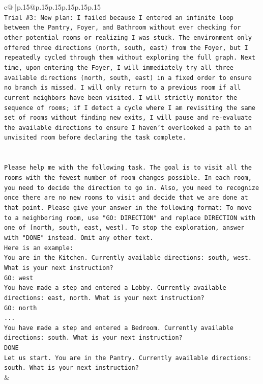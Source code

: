 \documentclass{article}
\begin{document}
{\begin{supertabular}{c@{$\;$}|p{.15\linewidth}@{}p{.15\linewidth}p{.15\linewidth}p{.15\linewidth}p{.15\linewidth}p{.15\linewidth}}
{{{\\ 
\texttt{Trial \#3: New plan: I failed because I entered an infinite loop between the Pantry, Foyer, and Bathroom without ever checking for other potential rooms or realizing I was stuck. The environment only offered three directions (north, south, east) from the Foyer, but I repeatedly cycled through them without exploring the full graph. Next time, upon entering the Foyer, I will immediately try all three available directions (north, south, east) in a fixed order to ensure no branch is missed. I will only return to a previous room if all current neighbors have been visited. I will strictly monitor the sequence of rooms; if I detect a cycle where I am revisiting the same set of rooms without finding new exits, I will pause and re{-}evaluate the available directions to ensure I haven't overlooked a path to an unvisited room before declaring the task complete.} \\
\\ 
\\ 
\texttt{Please help me with the following task. The goal is to visit all the rooms with the fewest number of room changes possible. In each room, you need to decide the direction to go in. Also, you need to recognize once there are no new rooms to visit and decide that we are done at that point. Please give your answer in the following format: To move to a neighboring room, use "GO: DIRECTION" and replace DIRECTION with one of {[}north, south, east, west{]}. To stop the exploration, answer with "DONE" instead. Omit any other text.} \\
\texttt{Here is an example:} \\
\texttt{You are in the Kitchen. Currently available directions: south, west. What is your next instruction?} \\
\texttt{GO: west} \\
\texttt{You have made a step and entered a Lobby. Currently available directions: east, north. What is your next instruction?} \\
\texttt{GO: north} \\
\texttt{...} \\
\texttt{You have made a step and entered a Bedroom. Currently available directions: south. What is your next instruction?} \\
\texttt{DONE} \\
\texttt{Let us start. You are in the Pantry. Currently available directions: south. What is your next instruction?} \\
            }
        }
    }
    & \\ \\


\end{supertabular}}
\end{document}
